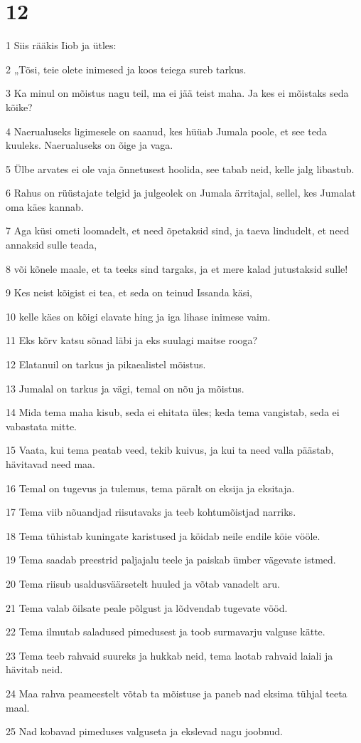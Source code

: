 \chapter{12}

\par 1 Siis rääkis Iiob ja ütles:
\par 2 „Tõsi, teie olete inimesed ja koos teiega sureb tarkus.
\par 3 Ka minul on mõistus nagu teil, ma ei jää teist maha. Ja kes ei mõistaks seda kõike?
\par 4 Naerualuseks ligimesele on saanud, kes hüüab Jumala poole, et see teda kuuleks. Naerualuseks on õige ja vaga.
\par 5 Ülbe arvates ei ole vaja õnnetusest hoolida, see tabab neid, kelle jalg libastub.
\par 6 Rahus on rüüstajate telgid ja julgeolek on Jumala ärritajal, sellel, kes Jumalat oma käes kannab.
\par 7 Aga küsi ometi loomadelt, et need õpetaksid sind, ja taeva lindudelt, et need annaksid sulle teada,
\par 8 või kõnele maale, et ta teeks sind targaks, ja et mere kalad jutustaksid sulle!
\par 9 Kes neist kõigist ei tea, et seda on teinud Issanda käsi,
\par 10 kelle käes on kõigi elavate hing ja iga lihase inimese vaim.
\par 11 Eks kõrv katsu sõnad läbi ja eks suulagi maitse rooga?
\par 12 Elatanuil on tarkus ja pikaealistel mõistus.
\par 13 Jumalal on tarkus ja vägi, temal on nõu ja mõistus.
\par 14 Mida tema maha kisub, seda ei ehitata üles; keda tema vangistab, seda ei vabastata mitte.
\par 15 Vaata, kui tema peatab veed, tekib kuivus, ja kui ta need valla päästab, hävitavad need maa.
\par 16 Temal on tugevus ja tulemus, tema päralt on eksija ja eksitaja.
\par 17 Tema viib nõuandjad riisutavaks ja teeb kohtumõistjad narriks.
\par 18 Tema tühistab kuningate karistused ja köidab neile endile köie vööle.
\par 19 Tema saadab preestrid paljajalu teele ja paiskab ümber vägevate istmed.
\par 20 Tema riisub usaldusväärsetelt huuled ja võtab vanadelt aru.
\par 21 Tema valab õilsate peale põlgust ja lõdvendab tugevate vööd.
\par 22 Tema ilmutab saladused pimedusest ja toob surmavarju valguse kätte.
\par 23 Tema teeb rahvaid suureks ja hukkab neid, tema laotab rahvaid laiali ja hävitab neid.
\par 24 Maa rahva peameestelt võtab ta mõistuse ja paneb nad eksima tühjal teeta maal.
\par 25 Nad kobavad pimeduses valguseta ja ekslevad nagu joobnud.

